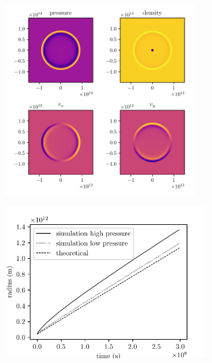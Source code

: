 \documentclass{beamer}
\begin{document}
\begin{frame}
	\begin{figure}[h]
		\centering
		\includegraphics[width=0.75\textwidth]{figures/output.pdf}
	\end{figure}	
\end{frame}
\begin{frame}
	\begin{figure}[h]
		\centering
		\includegraphics[width=0.8\textwidth]{../report/figures/non_linear_effects.pdf}
	\end{figure}
\end{frame}
\end{document}
